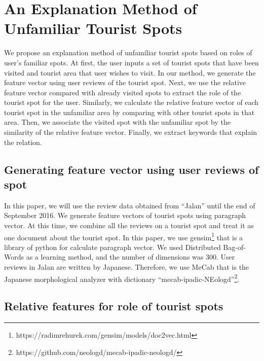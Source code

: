 \documentclass[journal]{IAENGtran}
\begin{document}
\section{An Explanation Method of Unfamiliar Tourist Spots}
\label{sec:An Explainaton Method of Unfamiliar Tourist Spots}
We propose an explanation method of unfamiliar tourist spots based on roles of user's familiar spots.
At first, the user inputs a set of tourist spots that have been visited and tourist area that user wishes to visit.
In our method, we generate the feature vector using user reviews of the tourist spot.
Next, we use the relative feature vector compared with already visited spots to extract the role of the tourist spot for the user.
Similarly, we calculate the relative feature vector of each tourist spot in the unfamiliar area by comparing with other tourist spots in that area.
Then, we associate the visited spot with the unfamiliar spot by the similarity of the relative feature vector.
Finally, we extract keywords that explain the relation.

\subsection{Generating feature vector using user reviews of spot}
\label{subsec:Generating feature vector using user reviews of spot}
In this paper, we will use the review data obtained from ``Jalan'' until the end of September 2016.
We generate feature vectors of tourist spots using paragraph vector\cite{Codd10}.
At this time, we combine all the reviews on a tourist spot and treat it as one document about the tourist spot.
In this paper, we use gensim\footnote{https://radimrehurek.com/gensim/models/doc2vec.html} that is a library of python for calculate paragraph vector.
We used Distributed Bag-of-Words as a learning method, and the number of dimensions was 300.
User reviews in Jalan are written by Japanese.
Therefore, we use MeCab\cite{Codd11} that is the Japanese morphological analyzer with dictionary ``mecab-ipadic-NEologd''\footnote{https://github.com/neologd/mecab-ipadic-neologd/}.

\subsection{Relative features for role of tourist spots}
\label{subsec:Relative features of tourist spots}
\end{document}
